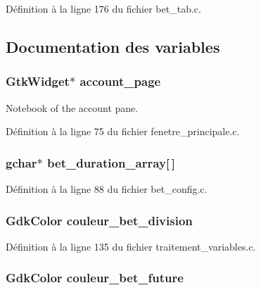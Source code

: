 Définition à la ligne 176 du fichier bet\_\-tab.c.



\subsection{Documentation des variables}
\subsubsection[{account\_\-page}]{\setlength{\rightskip}{0pt plus 5cm}GtkWidget$\ast$ {\bf account\_\-page}}\label{bet__tab_8c_ad5443d986a9ab5d64dd84c5346c4b87c}
Notebook of the account pane. 

Définition à la ligne 75 du fichier fenetre\_\-principale.c.

\subsubsection[{bet\_\-duration\_\-array}]{\setlength{\rightskip}{0pt plus 5cm}gchar$\ast$ {\bf bet\_\-duration\_\-array}[$\,$]}\label{bet__tab_8c_a9bc40d97c6989df4ee885344bc8110cd}


Définition à la ligne 88 du fichier bet\_\-config.c.

\subsubsection[{couleur\_\-bet\_\-division}]{\setlength{\rightskip}{0pt plus 5cm}GdkColor {\bf couleur\_\-bet\_\-division}}\label{bet__tab_8c_a9c6b0a0f3037804c43aa435dbb98f7ec}


Définition à la ligne 135 du fichier traitement\_\-variables.c.

\subsubsection[{couleur\_\-bet\_\-future}]{\setlength{\rightskip}{0pt plus 5cm}GdkColor {\bf couleur\_\-bet\_\-future}}\label{bet__tab_8c_af7f95b1eb6717e97b624b506258fd893}


